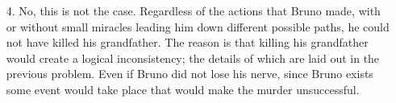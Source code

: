 \documentclass{article}
\begin{document}
\begin{enumerate}
\bigskip

\item[4.]
	No, this is not the case. Regardless of the actions that Bruno made, with or without small miracles leading him down different possible paths, he could not have killed his grandfather. The reason is that killing his grandfather would create a logical inconsistency; the details of which are laid out in the previous problem. Even if Bruno did not lose his nerve, since Bruno exists some event would take place that would make the murder unsuccessful. 

\end{enumerate}
\end{document}
